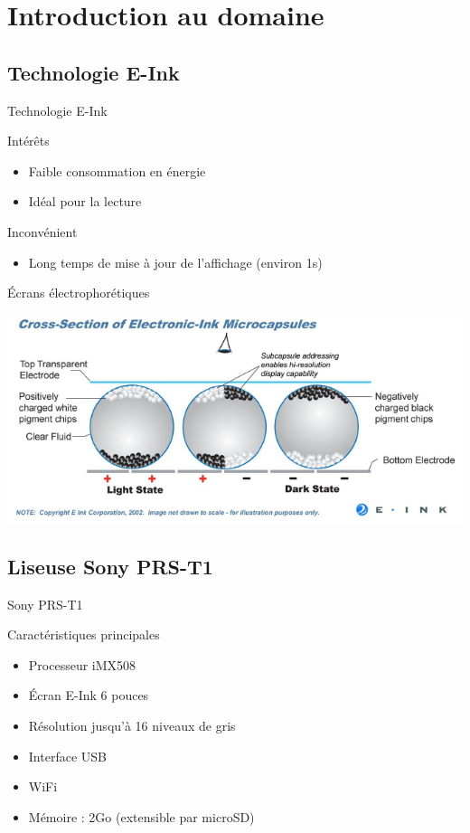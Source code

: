 \section[Introduction]{Introduction au domaine}


\subsection[E-Ink]{Technologie E-Ink}
\begin{frame}{Technologie E-Ink}
	\begin{block}{Intérêts}
		\begin{itemize}
			\item Faible consommation en énergie
			\item Idéal pour la lecture
		\end{itemize}
	\end{block}
		\begin{block}{Inconvénient}
		\begin{itemize}
			\item Long temps de mise à jour de l'affichage (environ 1s)
		\end{itemize}
	\end{block}
\end{frame}

\begin{frame}{Écrans électrophorétiques}
\begin{center}
	\includegraphics[width=0.8\linewidth]{Electrophoretic.png}
\end{center}	
\end{frame}


\subsection[Sony PRS-T1]{Liseuse Sony PRS-T1}

\begin{frame}{Sony PRS-T1} %
	\begin{block}{Caractéristiques principales}
		\begin{itemize}
			\item Processeur iMX508
			\item Écran E-Ink 6 pouces
			\item Résolution jusqu'à 16 niveaux de gris
			\item Interface USB
			\item WiFi
			\item Mémoire : 2Go (extensible par microSD)
		\end{itemize}
	\end{block}
\end{frame}

